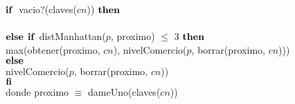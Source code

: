 \begin{tad}{}
{        %

        $\textrm{\textbf{if}}$\ vacio?(claves($cn$)) $\textrm{\textbf{then}}$ \\
             \\
        $\textrm{\textbf{else}}$ $\textrm{\textbf{if}}$ distManhattan($p$, proximo) $\leq$ 3 $\textrm{\textbf{then}}$ \\
            \tab max(obtener(proximo, $cn$), nivelComercio($p$, borrar(proximo, $cn$))) \\
        $\textrm{\textbf{else}}$ \\
            \tab nivelComercio($p$, borrar(proximo, $cn$)) \\
        $\textrm{\textbf{fi}}$  
        \\ donde proximo $\equiv$ dameUno(claves($cn$)) 
    }


\end{tad}
